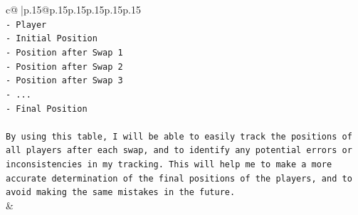\documentclass{article}
\begin{document}
{\begin{supertabular}{c@{$\;$}|p{.15\linewidth}@{}p{.15\linewidth}p{.15\linewidth}p{.15\linewidth}p{.15\linewidth}p{.15\linewidth}}
{{{\\ 
\texttt{{-} Player} \\
\texttt{{-} Initial Position} \\
\texttt{{-} Position after Swap 1} \\
\texttt{{-} Position after Swap 2} \\
\texttt{{-} Position after Swap 3} \\
\texttt{{-} ...} \\
\texttt{{-} Final Position} \\
\\ 
\texttt{By using this table, I will be able to easily track the positions of all players after each swap, and to identify any potential errors or inconsistencies in my tracking. This will help me to make a more accurate determination of the final positions of the players, and to avoid making the same mistakes in the future.} \\
            }
        }
    }
    & \\ \\

\end{supertabular}
}
\end{document}
